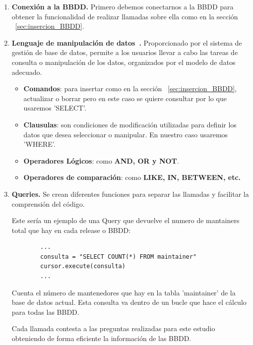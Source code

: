 \documentclass[a4paper, 12pt]{book}
\begin{document}
\begin{enumerate}
	\item \textbf{Conexión a la BBDD.} Primero debemos conectarnos a la BBDD para obtener la funcionalidad de realizar llamadas sobre ella como en la sección ~\ref{sec:insercion_BBDD}.
	
	\item \textbf{Lenguaje de manipulación de datos~\cite{geotalleres:_sql}.} Proporcionado por el sistema de gestión de base de datos, permite a los usuarios llevar a cabo las tareas de consulta o manipulación de los datos, organizados por el modelo de datos adecuado. 

	\begin{itemize}
		\item \textbf{Comandos}: para insertar como en la sección ~\ref{sec:insercion_BBDD}, actualizar o borrar pero en este caso se quiere consultar por lo que usaremos 'SELECT'.
		
		\item \textbf{Clausulas}: son condiciones de modificación utilizadas para definir los datos que desea seleccionar o manipular. En nuestro caso usaremos 'WHERE'.
		
		\item \textbf{Operadores Lógicos}: como \textbf{AND, OR y NOT}.
		
		\item \textbf{Operadores de comparación}: como \textbf{LIKE, IN, BETWEEN, etc.}
		
	\end{itemize}
	
	\item \textbf{Queries.} Se crean diferentes funciones para separar las llamadas y facilitar la comprensión del código. 
	
	
	
	Este sería un ejemplo de una Query que devuelve el numero de mantainers total que hay en cada release o BBDD:
	
	\begin{verbatim}
		...
		consulta = "SELECT COUNT(*) FROM maintainer"
		cursor.execute(consulta)
		...
	\end{verbatim} 
	
	Cuenta el número de mantenedores que hay en la tabla 'maintainer' de la base de datos actual. Esta consulta va dentro de un bucle que hace el cálculo para todas las BBDD.
	
	Cada llamada contesta a las preguntas realizadas para este estudio obteniendo de forma eficiente la información de las BBDD.
	 
\end{enumerate}
\end{document}
